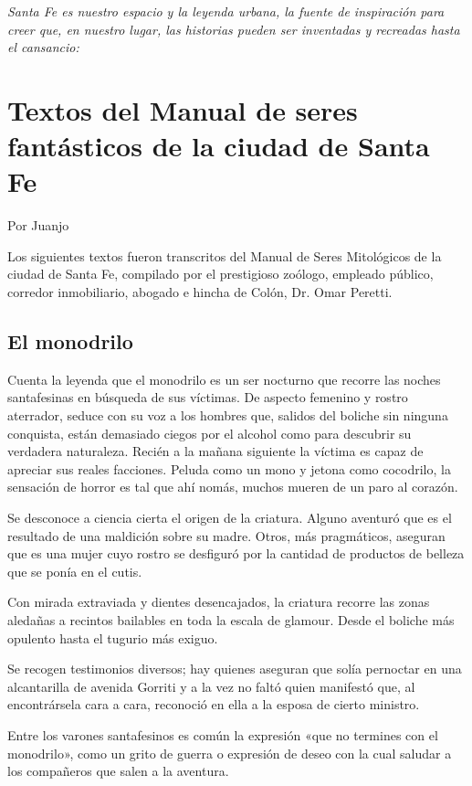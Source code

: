 \documentclass[11pt,twoside,openright,a5paper]{book}
\begin{document}
\emph{Santa Fe es nuestro espacio y la leyenda urbana, la fuente de inspiración para creer que, en nuestro lugar, las historias pueden ser inventadas y recreadas hasta el cansancio:}

\section*{Textos del Manual de seres fantásticos de la ciudad de Santa Fe}

                         \begin{flushright}Por Juanjo\end{flushright}

Los siguientes textos fueron transcritos del Manual de Seres Mitológicos de la ciudad de Santa Fe, compilado por el prestigioso zoólogo, empleado público, corredor inmobiliario, abogado e hincha de Colón, Dr. Omar Peretti.

\subsection*{El monodrilo}

Cuenta la leyenda que el monodrilo es un ser nocturno que recorre las noches santafesinas en búsqueda de sus víctimas. De aspecto femenino y rostro aterrador, seduce con su voz a los hombres que, salidos del boliche sin ninguna conquista, están demasiado ciegos por el alcohol como para descubrir su verdadera naturaleza. Recién a la mañana siguiente la víctima es capaz de apreciar sus reales facciones. Peluda como un mono y jetona como cocodrilo, la sensación de horror es tal que ahí nomás, muchos mueren de un paro al corazón.

Se desconoce a ciencia cierta el origen de la criatura. Alguno aventuró que es el resultado de una maldición sobre su madre. Otros, más pragmáticos, aseguran que es una mujer cuyo rostro se desfiguró por la cantidad de productos de belleza que se ponía en el cutis.

Con mirada extraviada y dientes desencajados, la criatura recorre las zonas aledañas a recintos bailables en toda la escala de glamour. Desde el boliche más opulento hasta el tugurio más exiguo.

Se recogen testimonios diversos; hay quienes aseguran que solía pernoctar en una alcantarilla de avenida Gorriti y a la vez no faltó quien manifestó que, al encontrársela cara a cara, reconoció en ella a la esposa de cierto ministro.

Entre los varones santafesinos es común la expresión «que no termines con el monodrilo», como un grito de guerra o expresión de deseo con la cual saludar a los compañeros que salen a  la aventura.
\end{document}
